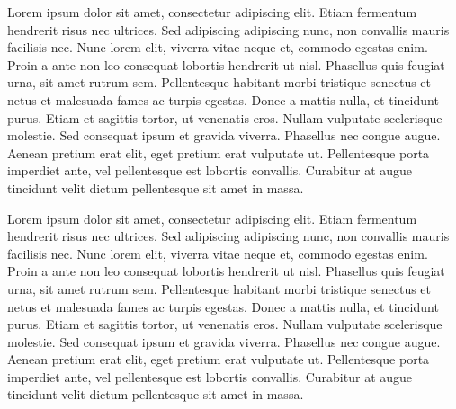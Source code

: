 Lorem ipsum dolor sit amet, consectetur adipiscing elit. Etiam fermentum hendrerit risus nec ultrices. Sed adipiscing adipiscing nunc, non convallis mauris facilisis nec. Nunc lorem elit, viverra vitae neque et, commodo egestas enim. Proin a ante non leo consequat lobortis hendrerit ut nisl. Phasellus quis feugiat urna, sit amet rutrum sem. Pellentesque habitant morbi tristique senectus et netus et malesuada fames ac turpis egestas. Donec a mattis nulla, et tincidunt purus. Etiam et sagittis tortor, ut venenatis eros. Nullam vulputate scelerisque molestie. Sed consequat ipsum et gravida viverra. Phasellus nec congue augue. Aenean pretium erat elit, eget pretium erat vulputate ut. Pellentesque porta imperdiet ante, vel pellentesque est lobortis convallis. Curabitur at augue tincidunt velit dictum pellentesque sit amet in massa.

Lorem ipsum dolor sit amet, consectetur adipiscing elit. Etiam fermentum hendrerit risus nec ultrices. Sed adipiscing adipiscing nunc, non convallis mauris facilisis nec. Nunc lorem elit, viverra vitae neque et, commodo egestas enim. Proin a ante non leo consequat lobortis hendrerit ut nisl. Phasellus quis feugiat urna, sit amet rutrum sem. Pellentesque habitant morbi tristique senectus et netus et malesuada fames ac turpis egestas. Donec a mattis nulla, et tincidunt purus. Etiam et sagittis tortor, ut venenatis eros. Nullam vulputate scelerisque molestie. Sed consequat ipsum et gravida viverra. Phasellus nec congue augue. Aenean pretium erat elit, eget pretium erat vulputate ut. Pellentesque porta imperdiet ante, vel pellentesque est lobortis convallis. Curabitur at augue tincidunt velit dictum pellentesque sit amet in massa.